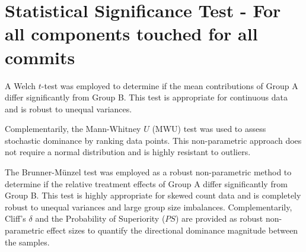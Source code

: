 \section{Statistical Significance Test - For all components touched for all commits} 

A Welch $t$-test was employed to determine if the mean contributions of Group A differ significantly from Group B. This test is appropriate for continuous data and is robust to unequal variances. 
 
Complementarily, the Mann-Whitney $U$ (MWU) test was used to assess stochastic dominance by ranking data points. This non-parametric approach does not require a normal distribution and is highly resistant to outliers. 
 
The Brunner-Münzel test was employed as a robust non-parametric method to determine if the relative treatment effects of Group A differ significantly from Group B. This test is highly appropriate for skewed count data and is completely robust to unequal variances and large group size imbalances. Complementarily, Cliff's $\delta$ and the Probability of Superiority ($PS$) are provided as robust non-parametric effect sizes to quantify the directional dominance magnitude between the samples. 
 

